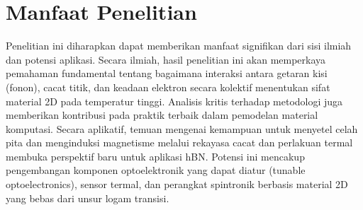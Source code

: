 \section{Manfaat Penelitian}
Penelitian ini diharapkan dapat memberikan manfaat signifikan dari sisi ilmiah dan potensi aplikasi.
Secara ilmiah, hasil penelitian ini akan memperkaya pemahaman fundamental tentang bagaimana interaksi antara getaran kisi (fonon), cacat titik, dan keadaan elektron secara kolektif menentukan sifat material 2D pada temperatur tinggi. Analisis kritis terhadap metodologi juga memberikan kontribusi pada praktik terbaik dalam pemodelan material komputasi.
Secara aplikatif, temuan mengenai kemampuan untuk menyetel celah pita dan menginduksi magnetisme melalui rekayasa cacat dan perlakuan termal membuka perspektif baru untuk aplikasi hBN. Potensi ini mencakup pengembangan komponen optoelektronik yang dapat diatur (tunable optoelectronics), sensor termal, dan perangkat spintronik berbasis material 2D yang bebas dari unsur logam transisi.